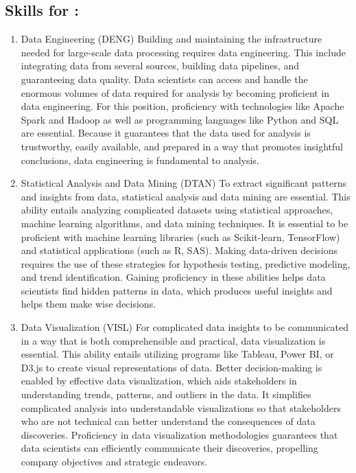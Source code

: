 \documentclass[a4paper, 11pt]{report}
\begin{document}
\subsection{Skills for \majB: \studB}

\begin{enumerate}
	\item Data Engineering (DENG)
Building and maintaining the infrastructure needed for large-scale data processing requires data engineering. This include integrating data from several sources, building data pipelines, and guaranteeing data quality. Data scientists can access and handle the enormous volumes of data required for analysis by becoming proficient in data engineering. For this position, proficiency with technologies like Apache Spark and Hadoop as well as programming languages like Python and SQL are essential. Because it guarantees that the data used for analysis is trustworthy, easily available, and prepared in a way that promotes insightful conclusions, data engineering is fundamental to analysis.
	
	\item Statistical Analysis and Data Mining (DTAN)
To extract significant patterns and insights from data, statistical analysis and data mining are essential. This ability entails analyzing complicated datasets using statistical approaches, machine learning algorithms, and data mining techniques. It is essential to be proficient with machine learning libraries (such as Scikit-learn, TensorFlow) and statistical applications (such as R, SAS). Making data-driven decisions requires the use of these strategies for hypothesis testing, predictive modeling, and trend identification. Gaining proficiency in these abilities helps data scientists find hidden patterns in data, which produces useful insights and helps them make wise decisions.

	\item Data Visualization (VISL)
For complicated data insights to be communicated in a way that is both comprehensible and practical, data visualization is essential. This ability entails utilizing programs like Tableau, Power BI, or D3.js to create visual representations of data. Better decision-making is enabled by effective data visualization, which aids stakeholders in understanding trends, patterns, and outliers in the data. It simplifies complicated analysis into understandable visualizations so that stakeholders who are not technical can better understand the consequences of data discoveries. Proficiency in data visualization methodologies guarantees that data scientists can efficiently communicate their discoveries, propelling company objectives and strategic endeavors.

\end{enumerate}
\end{document}
